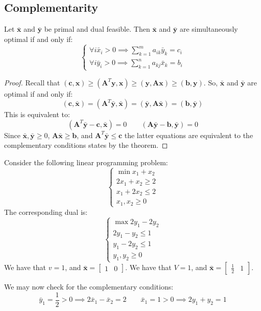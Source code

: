 \subsection{Complementarity}
\begin{theorem}
    Let $\bar{\mathbf{x}}$ and $\bar{\mathbf{y}}$ be primal and dual feasible. 
    Then $\bar{\mathbf{x}}$ and $\bar{\mathbf{y}}$ are simultaneously optimal if and only if: 
    \[\begin{cases}
        \forall i \bar{x}_i>0 \implies\sum_{k=1}^ma_{ik}\bar{y}_k=c_i \\
        \forall i \bar{y}_i>0 \implies\sum_{k=1}^na_{kj}\bar{x}_k=b_i 
    \end{cases}\]
\end{theorem}
\begin{proof}
    Recall that $(\mathbf{c},\mathbf{x})\geq(\mathbf{A}^T\mathbf{y},\mathbf{x})\geq(\mathbf{y},\mathbf{Ax})\geq(\mathbf{b},\mathbf{y})$.
    So, $\bar{\mathbf{x}}$ and $\bar{\mathbf{y}}$ are optimal if and only if: 
    \[(\mathbf{c},\bar{\mathbf{x}})=(\mathbf{A}^T\bar{\mathbf{y}},\bar{\mathbf{x}})=(\bar{\mathbf{y}},\mathbf{A}\bar{\mathbf{x}})=(\mathbf{b},\bar{\mathbf{y}})\]
    This is equivalent to: 
    \[(\mathbf{A}^T\bar{\mathbf{y}}-\mathbf{c},\bar{\mathbf{x}})=0 \qquad (\mathbf{A}\bar{\mathbf{y}}-\mathbf{b},\bar{\mathbf{y}})=0 \]
    Since $\bar{\mathbf{x}}, \bar{\mathbf{y}}\geq 0$, $\mathbf{A}\bar{\mathbf{x}}\geq \mathbf{b}$, and $\mathbf{A}^T\bar{\mathbf{y}}\leq\mathbf{c}$ the latter equations are equivalent to the complementary conditions states by the theorem.
\end{proof}
\begin{example}
    Consider the following linear programming problem: 
    \[\begin{cases}
        \min x_1+x_2 \\
        2x_1+x_2 \geq 2 \\ 
        x_1 + 2x_2 \leq 2 \\
        x_1,x_2 \geq 0
    \end{cases}\]
    The corresponding dual is: 
    \[\begin{cases}
        \max 2y_1-2y_2 \\
        2y_1 - y_2 \leq 1 \\
        y_1-2y_2 \leq 1 \\
        y_1,y_2 \geq 0
    \end{cases}\]
    We have that $v=1$, and $\bar{\mathbf{x}}=\begin{bmatrix} 1 & 0 \end{bmatrix}$. 
    We have that $V=1$, and $\bar{\mathbf{x}}=\begin{bmatrix} \frac{1}{2} & 1 \end{bmatrix}$.

    We may now check for the complementary conditions: 
    \[\bar{y}_1=\dfrac{1}{2}>0\implies2\bar{x}_1-\bar{x}_2=2 \qquad \bar{x}_1=1>0 \implies 2y_1+y_2=1\]
\end{example}
